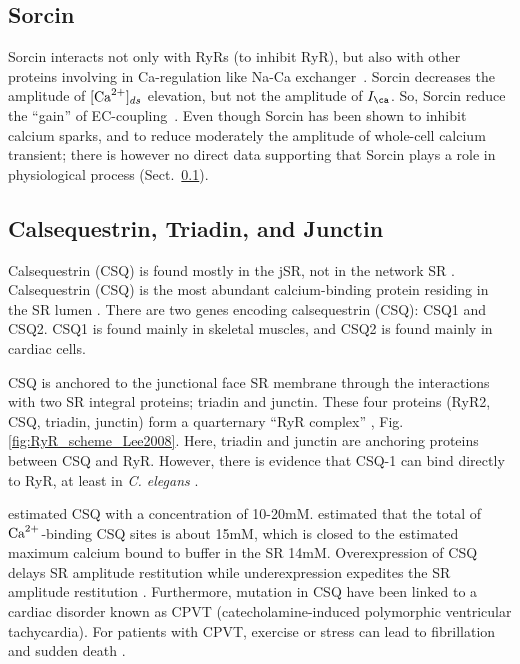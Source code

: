 \subsection{Sorcin}
\label{sec:RyR_sorcin}
\label{sec:sorcin}

Sorcin interacts not only with RyRs (to inhibit RyR), but also with other
proteins involving in Ca-regulation like Na-Ca
exchanger~\cite{Rueda2006,Zamparelli2010}. Sorcin decreases the amplitude of
$[{\text{Ca}^{2+}}]_{ds}$ elevation, but not the amplitude of $I_\ca$. So, Sorcin reduce the
``gain'' of EC-coupling~\citep{Farrell2004}. Even though Sorcin has been shown
to inhibit calcium sparks, and to reduce moderately the amplitude of whole-cell
calcium transient; there is however no direct data supporting that Sorcin plays
a role in physiological process (Sect.~\ref{sec:RyR_sorcin}).



\subsection{Calsequestrin, Triadin, and Junctin}
\label{sec:RyR_CSQ_Triadin_Junctin}

Calsequestrin (CSQ) is found mostly in the jSR, not in the network SR
\citep{Jorgensen1984}. Calsequestrin (CSQ) is the most abundant calcium-binding
protein residing in the SR lumen \citep{ikemoto1972, beard2004}.
There are two genes encoding calsequestrin (CSQ): CSQ1 and CSQ2. CSQ1 is found
mainly in skeletal muscles, and CSQ2 is found mainly in cardiac cells.

CSQ is anchored to the junctional face SR membrane through the interactions with
two SR integral proteins; triadin and junctin. These four proteins (RyR2, CSQ,
triadin, junctin) form a quarternary ``RyR complex'' \citep{zhang1997},
Fig.\ref{fig:RyR_scheme_Lee2008}. Here, triadin and junctin are
anchoring proteins between CSQ and RyR. However, there is evidence that CSQ-1
can bind directly to RyR, at least in {\it C. elegans} \citep{Cho2007}.

\citep{MacLennan1971} estimated CSQ with a concentration of 10-20mM.
\citep{shannon1997} estimated that the total of ${\text{Ca}^{2+}}$-binding CSQ sites is about
15mM, which is closed to the estimated maximum calcium bound to buffer in the SR
14mM. Overexpression of CSQ delays SR amplitude restitution while
underexpression expedites the SR amplitude restitution \citep{terentyev2003cdf}.
Furthermore, mutation in CSQ have been linked to a cardiac disorder known as
CPVT (catecholamine-induced polymorphic ventricular tachycardia). For patients
with CPVT, exercise or stress can lead to fibrillation and sudden death
\citep{Lahat2001}.

